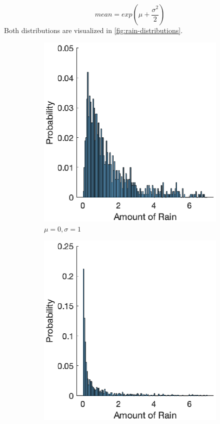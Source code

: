 \documentclass[12pt, a4paper, oneside]{article}
\begin{document}
\begin{equation}
	mean = exp(\mu+\frac{\sigma^2}{2}) \label{eq:rainfall}
\end{equation} 
Both distributions are visualized in \ref{fig:rain-distributions}.
\begin{figure}
	\begin{subfigure}{0.5\textwidth}
		\centering
		\includegraphics[width=1\textwidth]{figures/rainfall-default.eps}
		\caption{$\mu=0, \sigma=1$}
		\label{fig:rainfall-default}
	\end{subfigure}%
	\begin{subfigure}{.5\textwidth}
		\centering
		\includegraphics[width=1\textwidth]{figures/rainfall-more-volatile.eps}

\end{subfigure}
\end{figure}
\end{document}
